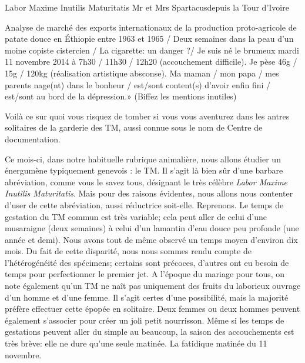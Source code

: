 \newpage




\vspace*{-2cm}\begin{article}{Labor Maxime Inutilis Maturitatis}
{Mr et Mrs Spartacus}{depuis la Tour d’Ivoire}

\vspace*{1mm}
 Analyse de marché des exports internationaux de la production proto-agricole de patate douce en Éthiopie entre 1963 et 1965 / Deux semaines dans la peau d’un moine copiste cistercien / La cigarette: un danger ?/ Je suis né le brumeux mardi 11 novembre 2014 à 7h30 / 11h30 / 12h20 (accouchement difficile). Je pèse 46g / 15g / 120kg (réalisation artistique absconse). Ma maman / mon papa / mes parents nage(nt) dans le bonheur /  est/sont content(s) d’avoir enfin fini / est/sont au bord de la dépression.» (Biffez les mentions inutiles)

Voilà ce sur quoi vous risquez de tomber si vous vous aventurez dans les antres solitaires de la garderie des TM, aussi connue sous le nom de Centre de documentation. 

Ce mois-ci, dans notre habituelle rubrique animalière, nous allons étudier un énergumène typiquement genevois : le TM. Il s’agit là bien sûr d’une barbare abréviation, comme vous le savez tous, désignant le très célèbre \textit{Labor Maxime Inutilis Maturitatis}. Mais pour des raisons évidentes, nous allons nous contenter d’user de cette abréviation, aussi réductrice soit-elle. Reprenons. Le temps de gestation du TM commun est très variable; cela peut aller de celui d’une musaraigne (deux semaines) à celui d’un lamantin d’eau douce peu profonde (une année et demi). Nous avons tout de même observé un temps moyen d’environ dix mois. Du fait de cette disparité, nous nous sommes rendu compte de l'hétérogénéité des spécimens; certains sont précoces, d’autres ont eu besoin de temps pour perfectionner le premier jet. A l’époque du mariage pour tous, on note également qu’un TM ne naît pas uniquement des fruits du laborieux ouvrage d’un homme et d’une femme. Il s’agit certes d’une possibilité, mais la majorité préfère effectuer cette épopée en solitaire. Deux femmes ou deux hommes peuvent également s’associer pour créer un joli petit nourrisson. Même si les temps de gestations peuvent aller du simple au beaucoup, la saison des accouchements est très brève: elle ne dure qu’une seule matinée. La fatidique matinée du 11 novembre.


\end{article}
